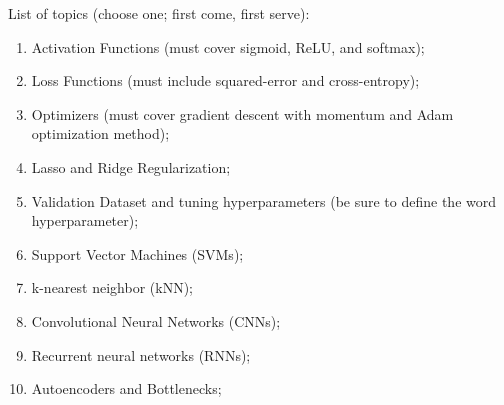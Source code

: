 \documentclass[12pt]{amsart}
\theoremstyle{definition}
\begin{document}
\noindent List of topics (choose one; first come, first serve): 
 \begin{enumerate}
\item Activation Functions (must cover sigmoid, ReLU, and softmax); %
\item Loss Functions (must include squared-error and cross-entropy); %
\item Optimizers (must cover gradient descent with momentum and Adam optimization method); %
\item Lasso and Ridge Regularization; %
\item Validation Dataset and tuning hyperparameters (be sure to define the word hyperparameter); %
\item Support Vector Machines (SVMs); %
\item k-nearest neighbor (kNN); %
\item Convolutional Neural Networks (CNNs); %
\item Recurrent neural networks (RNNs); %
\item Autoencoders and Bottlenecks; %
 \end{enumerate}

\vspace{.5in}

\end{document}
